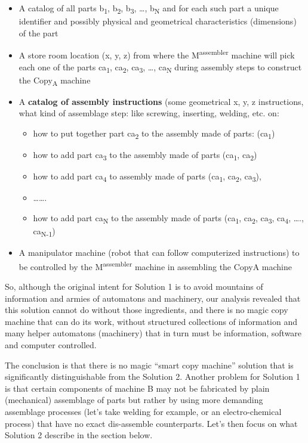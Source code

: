\begin{itemize}
\item A catalog of all parts b\textsubscript{1}, b\textsubscript{2},
b\textsubscript{3}, …, b\textsubscript{N  }and for each such part a
unique identifier and possibly physical and geometrical characteristics
(dimensions) of the part
\item A store room location (x, y, z)  from where the
M\textsuperscript{assembler} machine will pick each one of the parts
ca\textsubscript{1}, ca\textsubscript{2}, ca\textsubscript{3}, …,
ca\textsubscript{N }during assembly steps to construct the
Copy\textsubscript{A} machine
\item A \textbf{catalog of assembly instructions} (some geometrical x,
y, z instructions, what kind of assemblage step: like screwing,
inserting, welding, etc. on:

\begin{itemize}
\item how to put together part ca\textsubscript{2} to the assembly made
of parts: (ca\textsubscript{1})
\item how to add part ca\textsubscript{3} to the assembly made of parts
(ca\textsubscript{1}, ca\textsubscript{2})
\item how to add part ca\textsubscript{4} to assembly made of parts
(ca\textsubscript{1}, ca\textsubscript{2}, ca\textsubscript{3}),
\item …….
\item how to add part ca\textsubscript{N} to the assembly made of parts
(ca\textsubscript{1}, ca\textsubscript{2}, ca\textsubscript{3},
ca\textsubscript{4}, …., ca\textsubscript{N-1})
\end{itemize}
\item A manipulator machine (robot that can follow computerized
instructions) to  be controlled by the M\textsuperscript{assembler}
machine in assembling the CopyA machine
\end{itemize}
So, although the original intent for Solution 1 is to avoid mountains of
information and armies of automatons and machinery, our analysis
revealed that this solution cannot do without those ingredients, and
there is no magic copy machine that can do its work, without structured
collections of information and many helper automatons (machinery) that
in turn must be information, software and computer controlled.

The conclusion is that there is no magic “smart copy machine” solution
that is significantly distinguishable from the Solution 2. Another
problem for Solution 1 is that certain components of machine B may not
be fabricated by plain (mechanical) assemblage of parts but rather by
using more demanding assemblage processes (let’s take welding for
example, or an electro-chemical process) that have no exact
dis-assemble counterparts. Let’s then focus on what Solution 2 describe
in the section below.


